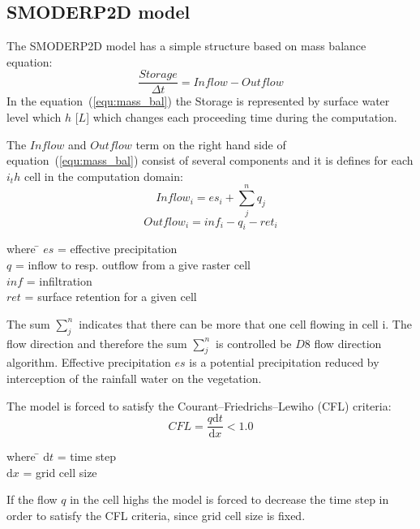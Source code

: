 \subsection{SMODERP2D model}
The SMODERP2D model has a simple structure based on mass balance equation:
\begin{equation}\label{equ:mass_bal}
    \frac{Storage}{\Delta t} = \nonumber  
    Inflow - Outflow
\end{equation}
In the equation~(\ref{equ:mass_bal}) the Storage is represented by
surface water level which $h$ [$L$] which changes each proceeding time
during the computation.

The $Inflow$ and $Outflow$ term on the right hand side of
equation~(\ref{equ:mass_bal}) consist of several components and it is
defines for each $i_th$ cell in the computation domain:
\begin{equation}\label{equ:inflow}
    Inflow_i = es_{i} + \sum_j^n q_{j}
\end{equation}
\begin{equation}\label{equ:outflow}
    Outflow_i = inf_{i} - q_{i} - ret_i
\end{equation}
\begin{tabbing} 
where \hspace{0.6cm} \= $es$ = effective precipitation\\
\> $q$ = inflow to resp. outflow from a give raster cell\\
\> $inf$ = infiltration\\
\> $ret$ = surface retention for a given cell
\end{tabbing}
The sum $\sum_j^n$ indicates that there can be more that one cell
flowing in cell i. The flow direction and therefore the sum $\sum_j^n$
is controlled be $D8$ flow direction algorithm.  Effective
precipitation $es$ is a potential precipitation reduced by
interception of the rainfall water on the vegetation.

The model is forced to satisfy the Courant–Friedrichs–Lewiho (CFL)
criteria:
\begin{equation}\label{equ:CFL}
    CFL = \frac{q\textrm{d}t}{\textrm{d}x} < 1.0
\end{equation}
\begin{tabbing} 
where \hspace{0.6cm} \= $\textrm{d}t$ = time step\\
\> $\textrm{d}x$ = grid cell size
\end{tabbing}
If the flow $q$ in the cell highs the model is forced to decrease the
time step in order to satisfy the CFL criteria, since grid cell size
is fixed.

